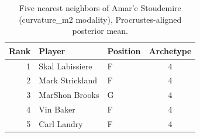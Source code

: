\begin{table}[htbp]
  \centering\small
  \begin{tabular}{rllc}
    \toprule
    Rank & Player & Position & Archetype \\
    \midrule
    1 & Skal Labissiere & F & 4 \\
    2 & Mark Strickland & F & 4 \\
    3 & MarShon Brooks & G & 4 \\
    4 & Vin Baker & F & 4 \\
    5 & Carl Landry & F & 4 \\
    \bottomrule
  \end{tabular}
  \caption{Five nearest neighbors of Amar'e Stoudemire (curvature_m2 modality), Procrustes-aligned posterior mean.}
  \label{tab:Amar_e_Stoudemire_neighbors_curvature_m2}
\end{table}

